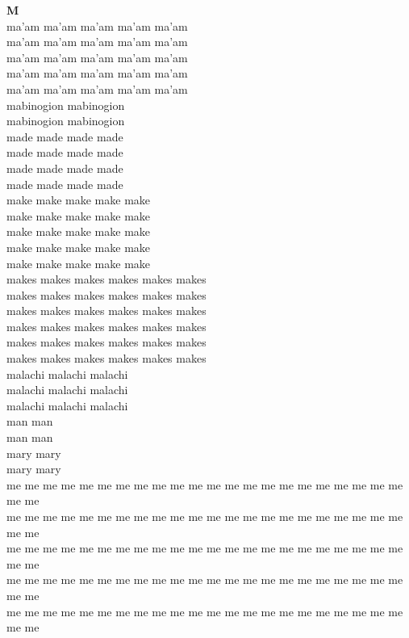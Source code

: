 \vspace{14pt}
\noindent\textbf{\Large M}\\[+12pt]
ma'am ma'am ma'am ma'am ma'am\\
ma'am ma'am ma'am ma'am ma'am\\
ma'am ma'am ma'am ma'am ma'am\\
ma'am ma'am ma'am ma'am ma'am\\
ma'am ma'am ma'am ma'am ma'am\\
mabinogion mabinogion\\
mabinogion mabinogion\\
made made made made\\
made made made made\\
made made made made\\
made made made made\\
make make make make make\\
make make make make make\\
make make make make make\\
make make make make make\\
make make make make make\\
makes makes makes makes makes makes\\
makes makes makes makes makes makes\\
makes makes makes makes makes makes\\
makes makes makes makes makes makes\\
makes makes makes makes makes makes\\
makes makes makes makes makes makes\\
malachi malachi malachi\\
malachi malachi malachi\\
malachi malachi malachi\\
man man\\
man man\\
mary mary\\
mary mary\\
me me me me me me me me me me me me me me me me me me me me me me me me\\
me me me me me me me me me me me me me me me me me me me me me me me me\\
me me me me me me me me me me me me me me me me me me me me me me me me\\
me me me me me me me me me me me me me me me me me me me me me me me me\\
me me me me me me me me me me me me me me me me me me me me me me me me\\
